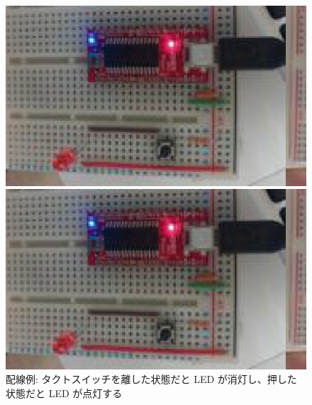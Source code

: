 \documentclass[11pt,a4paper]{jarticle}
\begin{document}
\begin{figure}[h!]
 \begin{minipage}{0.5\columnwidth}
  \centering
  \includegraphics[width=0.8\columnwidth]{img/release_switch.eps}
 \end{minipage}
 \begin{minipage}{0.5\columnwidth}
  \centering
  \includegraphics[width=0.8\columnwidth]{img/push_switch.eps}
 \end{minipage}
 \caption{配線例: タクトスイッチを離した状態だと LED が消灯し、押した状態だと LED が点灯する}
\end{figure}
\end{document}

